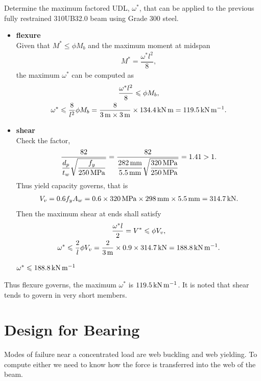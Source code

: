 \begin{exmp}
Determine the maximum factored UDL, $\omega^*$, that can be applied to the previous fully restrained 310UB32.0 beam using Grade 300 steel.
\end{exmp}
\begin{solution}
\begin{itemize}
\item \textbf{flexure}\\
Given that $M^*\leqslant\phi{}M_b$ and the maximum moment at midspan
\begin{gather*}
M^*=\dfrac{\omega^*l^2}{8},
\end{gather*}
the maximum $\omega^*$ can be computed as
\begin{gather*}
\dfrac{\omega^*l^2}{8}\leqslant\phi{}M_b,\\
\omega^*\leqslant\dfrac{8}{l^2}\phi{}M_b=\dfrac{8}{\SI{3}{\meter}\times\SI{3}{\meter}}\times\SI{134.4}{\kilo\newton\meter}=\SI{119.5}{\kilo\newton\per\meter}.
\end{gather*}
\item \textbf{shear}\\
Check the factor,
\begin{gather*}
\dfrac{82}{\dfrac{d_p}{t_w}\sqrt{\dfrac{f_y}{\SI{250}{\mega\pascal}}}}=\dfrac{82}{\dfrac{\SI{282}{\milli\meter}}{\SI{5.5}{\milli\meter}}\sqrt{\dfrac{\SI{320}{\mega\pascal}}{\SI{250}{\mega\pascal}}}}=1.41>1.
\end{gather*}
Thus yield capacity governs, that is
\begin{gather*}
V_v=0.6f_yA_w=0.6\times\SI{320}{\mega\pascal}\times\SI{298}{\milli\meter}\times\SI{5.5}{\milli\meter}=\SI{314.7}{\kilo\newton}.
\end{gather*}
Then the maximum shear at ends shall satisfy
\begin{gather*}
\dfrac{\omega^*l}{2}=V^*\leqslant\phi{}V_v,\\
\omega^*\leqslant\dfrac{2}{l}\phi{}V_v=\dfrac{2}{\SI{3}{\meter}}\times0.9\times\SI{314.7}{\kilo\newton}=\SI{188.8}{\kilo\newton\per\meter}.
\end{gather*}
\begin{flushright}
$\omega^*\leqslant\SI{188.8}{\kilo\newton\per\meter}$
\end{flushright}
\end{itemize}
Thus flexure governs, the maximum $\omega^*$ is $\SI{119.5}{\kilo\newton\per\meter}$. It is noted that shear tends to govern in very short members.
\end{solution}
\section{Design for Bearing}
Modes of failure near a concentrated load are web buckling and web yielding. To compute either we need to know how the force is transferred into the web of the beam.

